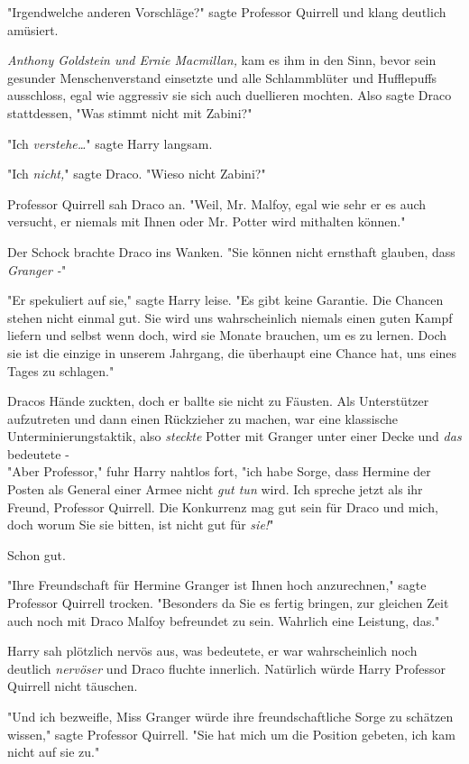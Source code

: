 {"Irgendwelche anderen Vorschläge?" sagte Professor Quirrell und klang deutlich amüsiert.

\emph{Anthony Goldstein und Ernie Macmillan,} kam es ihm in den Sinn, bevor sein gesunder Menschenverstand einsetzte und alle Schlammblüter und Hufflepuffs ausschloss, egal wie aggressiv sie sich auch duellieren mochten. Also sagte Draco stattdessen, "Was stimmt nicht mit Zabini?"

"Ich \emph{verstehe…}" sagte Harry langsam.

"Ich \emph{nicht,}" sagte Draco. "Wieso nicht Zabini?"

Professor Quirrell sah Draco an. "Weil, Mr. Malfoy, egal wie sehr er es auch versucht, er niemals mit Ihnen oder Mr. Potter wird mithalten können."

Der Schock brachte Draco ins Wanken. "Sie können nicht ernsthaft glauben, dass \emph{Granger -}"

"Er spekuliert auf sie," sagte Harry leise. "Es gibt keine Garantie. Die Chancen stehen nicht einmal gut. Sie wird uns wahrscheinlich niemals einen guten Kampf liefern und selbst wenn doch, wird sie Monate brauchen, um es zu lernen. Doch sie ist die einzige in unserem Jahrgang, die überhaupt eine Chance hat, uns eines Tages zu schlagen."

Dracos Hände zuckten, doch er ballte sie nicht zu Fäusten. Als Unterstützer aufzutreten und dann einen Rückzieher zu machen, war eine klassische Unterminierungstaktik, also \emph{steckte} Potter mit Granger unter einer Decke und \emph{das} bedeutete -\\ "Aber Professor," fuhr Harry nahtlos fort, "ich habe Sorge, dass Hermine der Posten als General einer Armee nicht \emph{gut tun} wird. Ich spreche jetzt als ihr Freund, Professor Quirrell. Die Konkurrenz mag gut sein für Draco und mich, doch worum Sie sie bitten, ist nicht gut für \emph{sie!}"

Schon gut.

"Ihre Freundschaft für Hermine Granger ist Ihnen hoch anzurechnen," sagte Professor Quirrell trocken. "Besonders da Sie es fertig bringen, zur gleichen Zeit auch noch mit Draco Malfoy befreundet zu sein. Wahrlich eine Leistung, das."

Harry sah plötzlich nervös aus, was bedeutete, er war wahrscheinlich noch deutlich \emph{nervöser} und Draco fluchte innerlich. Natürlich würde Harry Professor Quirrell nicht täuschen.

"Und ich bezweifle, Miss Granger würde ihre freundschaftliche Sorge zu schätzen wissen," sagte Professor Quirrell. "Sie hat mich um die Position gebeten, ich kam nicht auf sie zu."

}
